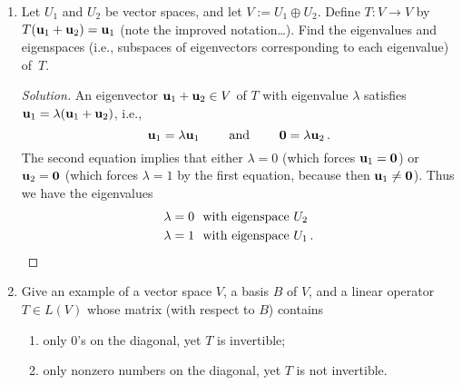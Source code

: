 \documentclass[11pt]{amsart}
\begin{document}
\begin{enumerate}[(1)]
\begin{proof}
\begin{enumerate}

\item
$\lambda$ is an eigenvalue of $T$
$\Longleftrightarrow$
$T(\v) = \lambda \v$ for some $\v \in V$
$\Longleftrightarrow$
$\v = T^{ -1 } (\lambda \v)$ for some $\v \in V$
$\Longleftrightarrow$
$\frac 1 \lambda \v = T^{ -1 } (\v)$ for some $\v \in V$
$\Longleftrightarrow$
$\frac 1 \lambda$ is an eigenvalue of $T^{ -1 }$.

\item We prove the result for $k \ge 0$ by induction.
The base case $k=0$ follows because $T^0(\v) = \v$ and so $\lambda^0 = 1$ is indeed an eigenvalue.
For the induction step, assume that $T^k(\v) = \lambda^k \, \v$ for some $k \ge 0$. Then
\[
  T^{ k+1 } (\v) = T \left( T^k(\v) \right) = T \left( \lambda^k \, \v \right) = \lambda^k \, T(\v) = \lambda^k \cdot \lambda \v = \lambda^{ k+1 } \, \v \, .
\]
The case $k<0$ follows with the above case $k>0$ and part (a).
\end{enumerate}
\end{proof}

\item Let $U_1$ and $U_2$ be vector spaces, and let $V := U_1 \oplus U_2$. Define $T: V \to V$ by $T(\mathbf u_1 + \mathbf u_2) = \mathbf u_1$ (note the improved notation\dots). Find the eigenvalues and eigenspaces (i.e., subspaces of eigenvectors corresponding to each eigenvalue) of~$T$.

\begin{proof}[Solution]
An eigenvector $\mathbf u_1 + \mathbf u_2 \in V$ of $T$ with eigenvalue $\lambda$ satisfies $\mathbf u_1 = \lambda (\mathbf u_1 + \mathbf u_2)$, i.e.,
\[
  \mathbf u_1 = \lambda \mathbf u_1
  \qquad \text{ and } \qquad
  \mathbf 0 = \lambda \mathbf u_2 \, .
\]
The second equation implies that either $\lambda = 0$ (which forces $\mathbf u_1 = \mathbf 0$) or $\mathbf u_2 = \mathbf 0$ (which forces $\lambda = 1$ by the first equation, because then $\mathbf u_1 \ne \mathbf 0$). Thus we have the eigenvalues
\begin{align*}
  \lambda &= 0 \ \text{ with eigenspace } U_2 \\
  \lambda &= 1 \ \text{ with eigenspace } U_1 \, . \qedhere
\end{align*}
\end{proof}

\item Give an example of a vector space $V$, a basis $B$ of $V$, and a linear operator $T \in L(V)$ whose matrix (with respect to $B$) contains
  \begin{enumerate}
  \item only 0's on the diagonal, yet $T$ is invertible;
  \item only nonzero numbers on the diagonal, yet $T$ is not invertible.
  \end{enumerate}


\end{enumerate}
\end{document}
